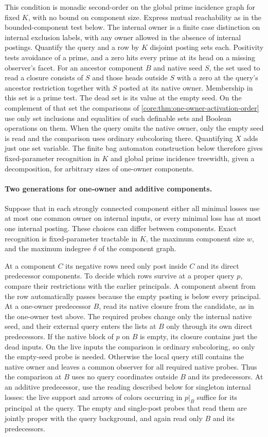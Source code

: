 This condition is monadic second-order on the global prime
incidence graph for fixed $K$, with no bound on component size.
Express mutual reachability as in the bounded-component test
below. The internal owner is a finite case distinction on
internal exclusion labels, with any owner allowed in the absence
of internal postings. Quantify the query and a row by $K$
disjoint posting sets each. Positivity tests avoidance of a prime,
and a zero hits every prime at its head on a missing observer's
facet. For an ancestor component $B$ and native seed $S$,
the set used to read a closure consists of $S$ and those heads
outside $S$ with a zero at the query's ancestor restriction
together with $S$ posted at its native owner. Membership in
this set is a prime test. The dead set is its value at the empty
seed. On the complement of that set the comparisons of
\cref{core:thm:one-owner-activation-order} use only set inclusions
and equalities of such definable sets and Boolean operations on them.
When the query omits the native owner, only the empty seed is
read and the comparison uses ordinary subcoloring there.
Quantifying $X$ adds just one set variable. The finite bag
automaton construction below therefore gives fixed-parameter
recognition in $K$ and global prime incidence treewidth, given
a decomposition, for arbitrary sizes of one-owner components.

\paragraph{Two generations for one-owner and additive components.}
Suppose that in each strongly connected component
either all minimal losses use at most one common
owner on internal inputs, or every minimal loss
has at most one internal posting. These choices
can differ between components. Exact recognition is
fixed-parameter tractable in $K$, the maximum
component size $w$, and the maximum indegree
$\delta$ of the component graph.

At a component $C$ its negative rows need only
post inside $C$ and its direct predecessor
components. To decide which rows survive at a
proper query $p$, compare their restrictions
with the earlier principals. A component absent
from the row automatically passes because the
empty posting is below every principal. At a
one-owner predecessor $B$, read its native closure
from the candidate, as in the one-owner test
above. The required probes change only the
internal native seed, and their external query
enters the lists at $B$ only through its own
direct predecessors. If the native block of $p$
on $B$ is empty, its closure contains just the
dead inputs. On the live inputs the comparison
is ordinary subcoloring, so only the empty-seed
probe is needed. Otherwise the local query still
contains the native owner and leaves a common
observer for all required native probes.
Thus the comparison at $B$ uses no query
coordinates outside $B$ and its predecessors.
At an additive predecessor, use the reading
described below for singleton internal losses:
the live support and arrows of colors occurring
in $p|_B$ suffice for its principal at the query.
The empty and single-post probes that read them
are jointly proper with the query background,
and again read only $B$ and its predecessors.

